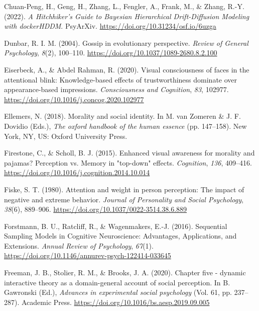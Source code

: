 \documentclass[
  man]{apa6}
\newlength{\cslhangindent}
\newlength{\cslentryspacingunit} %
\newenvironment{CSLReferences}[2] %
 {%
  \setlength{\parindent}{0pt}
  \ifodd #1
  \let\oldpar\par
  \def\par{\hangindent=\cslhangindent\oldpar}
  \fi
  \setlength{\parskip}{#2\cslentryspacingunit}
 }%
 {}
\begin{document}
\begin{CSLReferences}{1}{0}
\leavevmode{}%
Chuan-Peng, H., Geng, H., Zhang, L., Fengler, A., Frank, M., \& Zhang, R.-Y. (2022). \emph{A {Hitchhiker}'s {Guide} to {Bayesian} {Hierarchical} {Drift}-{Diffusion} {Modeling} with {dockerHDDM}}. PsyArXiv. \url{https://doi.org/10.31234/osf.io/6uzga}

\leavevmode{}%
Dunbar, R. I. M. (2004). Gossip in evolutionary perspective. \emph{Review of General Psychology}, \emph{8}(2), 100--110. \url{https://doi.org/10.1037/1089-2680.8.2.100}

\leavevmode{}%
Eiserbeck, A., \& Abdel Rahman, R. (2020). Visual consciousness of faces in the attentional blink: Knowledge-based effects of trustworthiness dominate over appearance-based impressions. \emph{Consciousness and Cognition}, \emph{83}, 102977. \url{https://doi.org/10.1016/j.concog.2020.102977}

\leavevmode{}%
Ellemers, N. (2018). Morality and social identity. In M. van Zomeren \& J. F. Dovidio (Eds.), \emph{The oxford handbook of the human essence} (pp. 147--158). New York, {NY}, {US}: Oxford University Press.

\leavevmode{}%
Firestone, C., \& Scholl, B. J. (2015). Enhanced visual awareness for morality and pajamas? Perception vs. Memory in "top-down" effects. \emph{Cognition}, \emph{136}, 409--416. \url{https://doi.org/10.1016/j.cognition.2014.10.014}

\leavevmode{}%
Fiske, S. T. (1980). Attention and weight in person perception: The impact of negative and extreme behavior. \emph{Journal of Personality and Social Psychology}, \emph{38}(6), 889--906. \url{https://doi.org/10.1037/0022-3514.38.6.889}

\leavevmode{}%
Forstmann, B. U., Ratcliff, R., \& Wagenmakers, E.-J. (2016). Sequential {Sampling} {Models} in {Cognitive} {Neuroscience}: {Advantages}, {Applications}, and {Extensions}. \emph{Annual Review of Psychology}, \emph{67}(1). \url{https://doi.org/10.1146/annurev-psych-122414-033645}

\leavevmode{}%
Freeman, J. B., Stolier, R. M., \& Brooks, J. A. (2020). Chapter five - dynamic interactive theory as a domain-general account of social perception. In B. Gawronski (Ed.), \emph{Advances in experimental social psychology} (Vol. 61, pp. 237--287). Academic Press. \url{https://doi.org/10.1016/bs.aesp.2019.09.005}


\end{CSLReferences}
\end{document}
